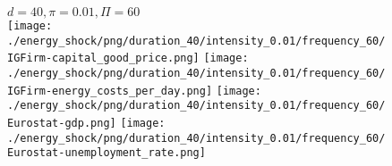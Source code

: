 \begin{figure}[ht!]
\centering\leavevmode
\begin{minipage}{17cm}
\centering\leavevmode
{$d=40, \pi=0.01, \Pi=60$}\\
\texttt{[image: ./energy\_shock/png/duration\_40/intensity\_0.01/frequency\_60/IGFirm-capital\_good\_price.png]}
\texttt{[image: ./energy\_shock/png/duration\_40/intensity\_0.01/frequency\_60/IGFirm-energy\_costs\_per\_day.png]}
\texttt{[image: ./energy\_shock/png/duration\_40/intensity\_0.01/frequency\_60/Eurostat-gdp.png]}
\texttt{[image: ./energy\_shock/png/duration\_40/intensity\_0.01/frequency\_60/Eurostat-unemployment\_rate.png]}
\end{minipage}
\end{figure}

